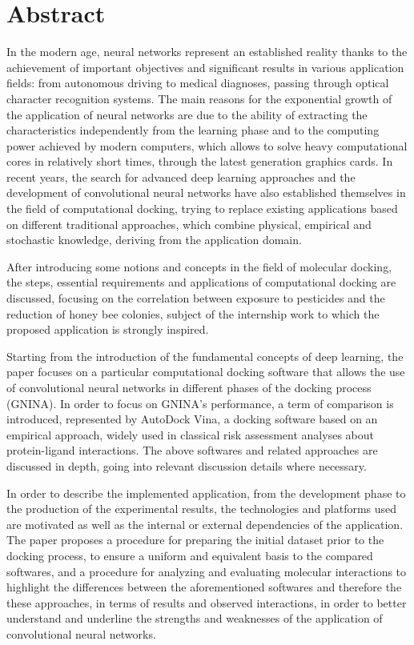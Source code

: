\chapter*{Abstract}
In the modern age, neural networks represent an established reality thanks to the achievement of important objectives and significant results in various application fields: from autonomous driving to medical diagnoses, passing through optical character recognition systems. The main reasons for the exponential growth of the application of neural networks are due to the ability of extracting the characteristics independently from the learning phase and to the computing power achieved by modern computers, which allows to solve heavy computational cores in relatively short times, through the latest generation graphics cards.
In recent years, the search for advanced deep learning approaches and the development of convolutional neural networks have also established themselves in the field of computational docking, trying to replace existing applications based on different traditional approaches, which combine physical, empirical and stochastic knowledge, deriving from the application domain.

After introducing some notions and concepts in the field of molecular docking, the steps, essential requirements and applications of computational docking are discussed, focusing on the correlation between exposure to pesticides and the reduction of honey bee colonies, subject of the internship work to which the proposed application is strongly inspired.


Starting from the introduction of the fundamental concepts of deep learning, the paper focuses on a particular computational docking software that allows the use of convolutional neural networks in different phases of the docking process (GNINA). In order to focus on GNINA's performance, a term of comparison is introduced, represented by AutoDock Vina, a docking software based on an empirical approach, widely used in classical risk assessment analyses about protein-ligand interactions. The above softwares and related approaches are discussed in depth, going into relevant discussion details where necessary.


In order to describe the implemented application, from the development phase to the production of the experimental results, the technologies and platforms used are motivated as well as the internal or external dependencies of the application.
The paper proposes a procedure for preparing the initial dataset prior to the docking process, to ensure a uniform and equivalent basis to the compared softwares, and a procedure for analyzing and evaluating molecular interactions to highlight the differences between the aforementioned softwares and therefore the these approaches, in terms of results and observed interactions, in order to better understand and underline the strengths and weaknesses of the application of convolutional neural networks.


